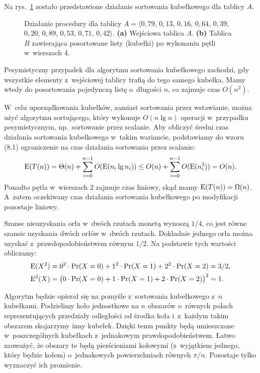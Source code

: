 
\exercise %
Na rys.\ \ref{fig:8.4-1} zostało przedstawione działanie sortowania kubełkowego dla tablicy $A$.
\begin{figure}[!ht]
	\centering 
	\caption{Działanie procedury  dla tablicy $A=\langle0{,}79$, $0{,}13$, $0{,}16$, $0{,}64$, $0{,}39$, $0{,}20$, $0{,}89$, $0{,}53$,\! $0{,}71$,\! $0{,}42\rangle$.
{\sffamily\bfseries(a)} Wejściowa tablica $A$.
{\sffamily\bfseries(b)} Tablica $B$ zawierająca posortowane listy (kubełki) po wykonaniu pętli w~wierszach 4.} \label{fig:8.4-1}
\end{figure}

\exercise %
Pesymistyczny przypadek dla algorytmu sortowania kubełkowego zachodzi, gdy wszystkie elementy z~wejściowej tablicy trafią do tego samego kubełka.
Mamy wtedy do posortowania pojedynczą listę o~długości $n$, co zajmuje czas $O(n^2)$.

W~celu uporządkowania kubełków, zamiast sortowania przez wstawianie, można użyć algorytmu sortującego, który wykonuje $O(n\lg n)$ operacji w~przypadku pesymistycznym, np.\ sortowanie przez scalanie.
Aby obliczyć średni czas działania sortowania kubełkowego w~takim wariancie, podstawiamy do wzoru (8.1) ograniczenie na czas działania sortowania przez scalanie:
\[
	\operatorname{E}(T(n)) = \Theta(n)+\sum_{i=0}^{n-1}O(\operatorname{E}(n_i\lg n_i)) \le O(n)+\sum_{i=0}^{n-1}O(\operatorname{E}(n_i^2)) = O(n).
\]
Ponadto pętla  w~wierszach 2 zajmuje czas liniowy, skąd mamy $\operatorname{E}(T(n))=\Omega(n)$.
A~zatem oczekiwany czas działania sortowania kubełkowego po modyfikacji pozostaje liniowy.

\exercise %
Szanse nieuzyskania orła w~dwóch rzutach monetą wynoszą $1/4$, co jest równe szansie uzyskania dwóch orłów w~dwóch rzutach.
Dokładnie jednego orła można uzyskać z~prawdopodobieństwem równym $1/2$.
Na podstawie tych wartości obliczamy:
\begin{align*}
	\operatorname{E}(X^2) &= 0^2\cdot\Pr(X=0)+1^2\cdot\Pr(X=1)+2^2\cdot\Pr(X=2) = 3/2, \\
	\operatorname{E}^2(X) &= \bigl(0\cdot\Pr(X=0)+1\cdot\Pr(X=1)+2\cdot\Pr(X=2)\bigr)^2 = 1.
\end{align*}

\exercise %
Algorytm będzie opierał się na pomyśle z~sortowania kubełkowego z~$n$ kubełkami.
Podzielimy koło jednostkowe na $n$ obszarów o~równych polach reprezentujących przedziały odległości od środka koła i~z~każdym takim obszarem skojarzymy inny kubełek.
Dzięki temu punkty będą umieszczane w~poszczególnych kubełkach z~jednakowym prawdopodobieństwem.
Łatwo zauważyć, że obszary te będą pierścieniami kołowymi (z~wyjątkiem jednego, który będzie kołem) o~jednakowych powierzchniach równych $\pi/n$.
Pozostaje tylko wyznaczyć ich promienie.

